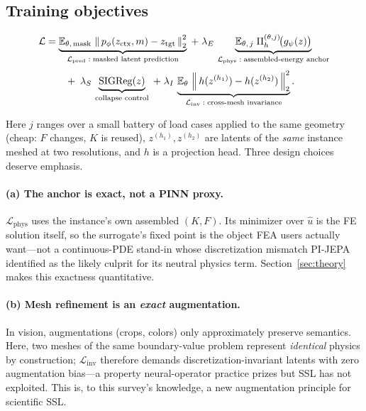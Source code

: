\documentclass[11pt]{article}
\newcommand{\E}{\mathbb{E}}
\newcommand{\norm}[1]{\left\lVert #1 \right\rVert}
\begin{document}
\subsection{Training objectives}
\label{sec:objectives}

\begin{align}
\mathcal{L}
&= \underbrace{\E_{\theta,\,\text{mask}}\,
   \norm{\,p_\phi(z_{\mathrm{ctx}},m)-z_{\mathrm{tgt}}\,}_2^2}_{\mathcal{L}_{\mathrm{pred}}\;:\;\text{masked latent prediction}}
\;+\;\lambda_E\,
\underbrace{\E_{\theta,\,j}\;\Pi_h^{(\theta,j)}\!\bigl(g_\psi(z)\bigr)}_{\mathcal{L}_{\mathrm{phys}}\;:\;\text{assembled-energy anchor}}
\notag\\[0.5ex]
&\qquad +\;\lambda_S\,
\underbrace{\mathrm{SIGReg}(z)}_{\text{collapse control}}
\;+\;\lambda_I\,
\underbrace{\E_{\theta}\,
   \norm{\,h(z^{(h_1)})-h(z^{(h_2)})\,}_2^2}_{\mathcal{L}_{\mathrm{inv}}\;:\;\text{cross-mesh invariance}}.
\label{eq:loss}
\end{align}

Here $j$ ranges over a small battery of load cases applied to the same
geometry (cheap: $F$ changes, $K$ is reused), $z^{(h_1)},z^{(h_2)}$ are
latents of the \emph{same} instance meshed at two resolutions, and $h$ is a
projection head. Three design choices deserve emphasis.

\paragraph{(a) The anchor is exact, not a PINN proxy.}
$\mathcal{L}_{\mathrm{phys}}$ uses the instance's own assembled $(K,F)$.
Its minimizer over $\hat u$ is the FE solution itself, so the surrogate's
fixed point is the object FEA users actually want---not a continuous-PDE
stand-in whose discretization mismatch PI-JEPA identified as the likely
culprit for its neutral physics term. Section~\ref{sec:theory} makes this
exactness quantitative.

\paragraph{(b) Mesh refinement is an \emph{exact} augmentation.}
In vision, augmentations (crops, colors) only approximately preserve
semantics. Here, two meshes of the same boundary-value problem represent
\emph{identical} physics by construction; $\mathcal{L}_{\mathrm{inv}}$
therefore demands discretization-invariant latents with zero augmentation
bias---a property neural-operator practice prizes
\cite{kovachki2023,li2023geofno} but SSL has not exploited. This is, to this
survey's knowledge, a new augmentation principle for scientific SSL.
\end{document}
